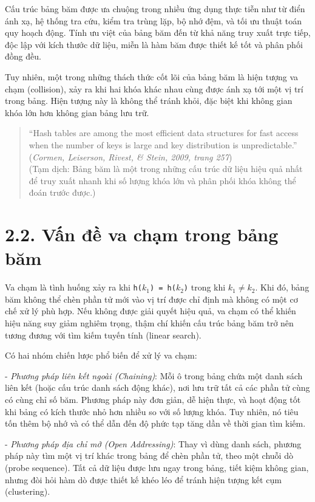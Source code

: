 \documentclass[12pt,a4paper]{report}
\begin{document}
Cấu trúc bảng băm được ưa chuộng trong nhiều ứng dụng thực tiễn như từ điển ánh xạ, hệ thống tra cứu, kiểm tra trùng lặp, bộ nhớ đệm, và tối ưu thuật toán quy hoạch động. Tính ưu việt của bảng băm đến từ khả năng truy xuất trực tiếp, độc lập với kích thước dữ liệu, miễn là hàm băm được thiết kế tốt và phân phối đồng đều.

Tuy nhiên, một trong những thách thức cốt lõi của bảng băm là hiện tượng va chạm (collision), xảy ra khi hai khóa khác nhau cùng được ánh xạ tới một vị trí trong bảng. Hiện tượng này là không thể tránh khỏi, đặc biệt khi không gian khóa lớn hơn không gian bảng lưu trữ.
\begin{quote}
“Hash tables are among the most efficient data structures for fast access when the number of keys is large and key distribution is unpredictable.”
(\textit{Cormen, Leiserson, Rivest, \& Stein, 2009, trang 257}) \\
(Tạm dịch: Bảng băm là một trong những cấu trúc dữ liệu hiệu quả nhất để truy xuất nhanh khi số lượng khóa lớn và phân phối khóa không thể đoán trước được.)
\end{quote}
\section*{2.2. Vấn đề va chạm trong bảng băm}
\noindent \indent Va chạm là tình huống xảy ra khi \texttt{h($k_1$) = h($k_2$)} trong khi \texttt{$k_1 \neq k_2$}. Khi đó, bảng băm không thể chèn phần tử mới vào vị trí được chỉ định mà không có một cơ chế xử lý phù hợp. Nếu không được giải quyết hiệu quả, va chạm có thể khiến hiệu năng suy giảm nghiêm trọng, thậm chí khiến cấu trúc bảng băm trở nên tương đương với tìm kiếm tuyến tính (linear search).

Có hai nhóm chiến lược phổ biến để xử lý va chạm:

- \textit{Phương pháp liên kết ngoài (Chaining)}:
Mỗi ô trong bảng chứa một danh sách liên kết (hoặc cấu trúc danh sách động khác), nơi lưu trữ tất cả các phần tử cùng có cùng chỉ số băm. Phương pháp này đơn giản, dễ hiện thực, và hoạt động tốt khi bảng có kích thước nhỏ hơn nhiều so với số lượng khóa. Tuy nhiên, nó tiêu tốn thêm bộ nhớ và có thể dẫn đến độ phức tạp tăng dần về thời gian tìm kiếm.

- \textit{Phương pháp địa chỉ mở (Open Addressing)}:
Thay vì dùng danh sách, phương pháp này tìm một vị trí khác trong bảng để chèn phần tử, theo một chuỗi dò (probe sequence). Tất cả dữ liệu được lưu ngay trong bảng, tiết kiệm không gian, nhưng đòi hỏi hàm dò được thiết kế khéo léo để tránh hiện tượng kết cụm (clustering).
\end{document}
